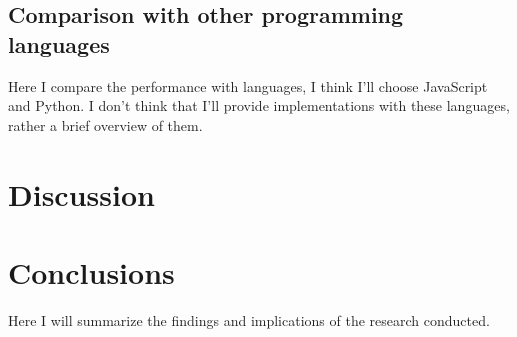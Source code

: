 \documentclass[a4paper,12pt]{llncs}
\numberwithin{equation}{section}
\begin{document}
\subsection{Comparison with other programming languages}
Here I compare the performance with languages, I think I'll choose JavaScript and Python.
I don't think that I'll provide implementations with these languages, rather a brief overview of them.
\section{Discussion}
\section{Conclusions}
Here I will summarize the findings and implications of the research conducted.



\end{document}
